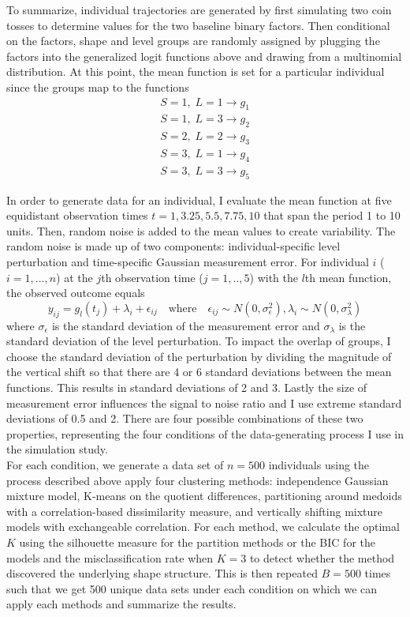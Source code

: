 \documentclass[12pt]{article}
\begin{document}
To summarize, individual trajectories are generated by first simulating two coin tosses to determine values for the two baseline binary factors. Then conditional on the factors, shape and level groups are randomly assigned by plugging the factors into the generalized logit functions above and drawing from a multinomial distribution. At this point, the mean function is set for a particular individual since the groups map to the functions
\begin{align*}
S = 1,\; L=1 \rightarrow g_{1}\\
S = 1,\; L=3 \rightarrow g_{2}\\
S = 2,\; L=2 \rightarrow g_{3}\\
S = 3,\; L=1 \rightarrow g_{4}\\
S = 3,\; L=3 \rightarrow g_{5}
\end{align*}

In order to generate data for an individual, I evaluate the mean function at five equidistant observation times $t=1,3.25,5.5,7.75,10$ that span the period 1 to 10 units. Then,  random noise is added to the mean values to create variability. The random noise is made up of two components: individual-specific level perturbation and time-specific Gaussian measurement error. For individual $i$ ($i=1,...,n$) at the $j$th observation time ($j=1,..,5$) with the $l$th mean function, the observed outcome equals
$$y_{ij} = g_{l}(t_{j})+\lambda_{i}+\epsilon_{ij}\quad\text{where}\quad \epsilon_{ij}\sim N(0,\sigma_{\epsilon}^{2}), \lambda_{i}\sim N(0,\sigma_{\lambda}^{2})$$
where $\sigma_{\epsilon}$  is the standard deviation of the measurement error and $\sigma_{\lambda}$ is the standard deviation of the level perturbation. To impact the overlap of groups, I choose the standard deviation of the perturbation by dividing the magnitude of the vertical shift so that there are 4 or 6 standard deviations between the mean functions. This results in standard deviations of 2 and 3. Lastly the size of measurement error influences the signal to noise ratio and I use extreme standard deviations of 0.5 and 2. There are four possible combinations of these two properties, representing the four  conditions of the data-generating process I use in the simulation study. \\

For each condition, we generate a data set of $n=500$ individuals using the process described above apply four clustering methods: independence Gaussian mixture model, K-means on the quotient differences, partitioning around medoids with a correlation-based dissimilarity measure, and vertically shifting mixture models with exchangeable correlation. For each method, we calculate the optimal $K$ using the silhouette measure \cite{kaufman}  for the partition methods or the BIC \cite{schartz} for the models and the misclassification rate when $K=3$ to detect whether the method discovered the underlying shape structure. This is then repeated $B=500$ times such that we get 500 unique data sets under each condition on which we can apply each methods and summarize the results. \\
\end{document}
